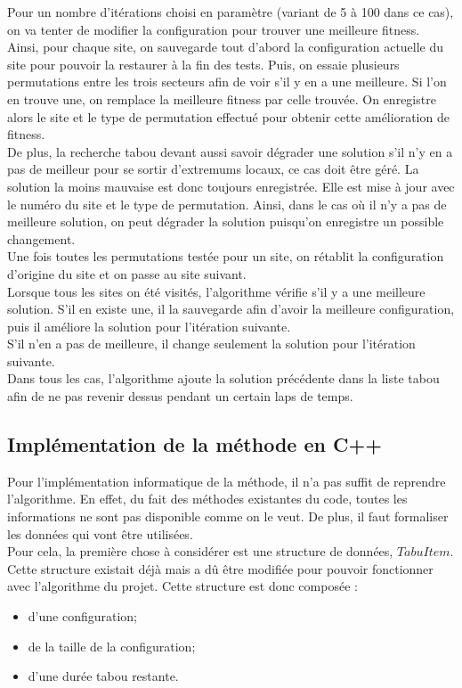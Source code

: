 \documentclass[a4paper, 11pt]{report}
\begin{document}
Pour un nombre d'itérations choisi en paramètre (variant de 5 à 100 dans ce cas), on va tenter de modifier la configuration pour trouver une meilleure fitness.\\
Ainsi, pour chaque site, on sauvegarde tout d'abord la configuration actuelle du site pour pouvoir la restaurer à la fin des tests. Puis, on essaie plusieurs permutations entre les trois secteurs afin de voir s'il y en a une meilleure. Si l'on en trouve une, on remplace la meilleure fitness par celle trouvée. On enregistre alors le site et le type de permutation effectué pour obtenir cette amélioration de fitness.\\
De plus, la recherche tabou devant aussi savoir dégrader une solution s'il n'y en a pas de meilleur pour se sortir d'extremums locaux, ce cas doit \^etre géré. La solution la moins mauvaise est donc toujours enregistrée. Elle est mise à jour avec le numéro du site et le type de permutation. Ainsi, dans le cas où il n'y a pas de meilleure solution, on peut dégrader la solution puisqu'on enregistre un possible changement.\\
Une fois toutes les permutations testée pour un site, on rétablit la configuration d'origine du site et on passe au site suivant.\\
Lorsque tous les sites on été visités, l'algorithme vérifie s'il y a une meilleure solution. S'il en existe une, il la sauvegarde afin d'avoir la meilleure configuration, puis il améliore la solution pour l'itération suivante.\\
 S'il n'en a pas de meilleure, il change seulement la solution pour l'itération suivante.\\
Dans tous les cas, l'algorithme ajoute la solution précédente dans la liste tabou afin de ne pas revenir dessus pendant un certain laps de temps.

			\subsection{Implémentation de la méthode en C++}
			
			Pour l'implémentation informatique de la méthode, il n'a pas suffit de reprendre l'algorithme. En effet, du fait des méthodes existantes du code, toutes les informations ne sont pas disponible comme on le veut. De plus, il faut formaliser les données qui vont être utilisées.\\
			Pour cela, la première chose à considérer est une structure de données, $TabuItem$. Cette structure existait déjà mais a dû être modifiée pour pouvoir fonctionner avec l'algorithme du projet. Cette structure est donc composée :
			\begin{itemize}
				\item d'une configuration;
				\item de la taille de la configuration;
				\item d'une durée tabou restante.
			\end{itemize}
			
\end{document}
